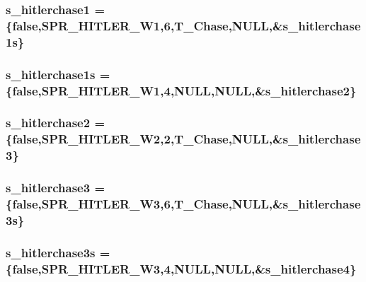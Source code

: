 \label{WL__ACT2_8C_a6982d149c8cf782eb51cdbd3885455cc}
\hypertarget{WL__ACT2_8C_aa89b8ca9d464e45092cc99529d5abef4}{
\subsubsection[{s\_\-hitlerchase1}]{ {\bf s\_\-hitlerchase1} = \{false,SPR\_\-HITLER\_\-W1,6,T\_\-Chase,NULL,\&{\bf s\_\-hitlerchase1s}\}}}
\label{WL__ACT2_8C_aa89b8ca9d464e45092cc99529d5abef4}
\hypertarget{WL__ACT2_8C_ad6fab59f3a334df59d3037a705c072da}{
\subsubsection[{s\_\-hitlerchase1s}]{ {\bf s\_\-hitlerchase1s} = \{false,SPR\_\-HITLER\_\-W1,4,NULL,NULL,\&{\bf s\_\-hitlerchase2}\}}}
\label{WL__ACT2_8C_ad6fab59f3a334df59d3037a705c072da}
\hypertarget{WL__ACT2_8C_add95d80cb6d278641cdad052769e29a6}{
\subsubsection[{s\_\-hitlerchase2}]{ {\bf s\_\-hitlerchase2} = \{false,SPR\_\-HITLER\_\-W2,2,T\_\-Chase,NULL,\&{\bf s\_\-hitlerchase3}\}}}
\label{WL__ACT2_8C_add95d80cb6d278641cdad052769e29a6}
\hypertarget{WL__ACT2_8C_a62624eaaaca44b10e1db9922b7bb9433}{
\subsubsection[{s\_\-hitlerchase3}]{ {\bf s\_\-hitlerchase3} = \{false,SPR\_\-HITLER\_\-W3,6,T\_\-Chase,NULL,\&{\bf s\_\-hitlerchase3s}\}}}
\label{WL__ACT2_8C_a62624eaaaca44b10e1db9922b7bb9433}
\hypertarget{WL__ACT2_8C_a20c282c075c0b1b525d887f2169e22c4}{
\subsubsection[{s\_\-hitlerchase3s}]{ {\bf s\_\-hitlerchase3s} = \{false,SPR\_\-HITLER\_\-W3,4,NULL,NULL,\&{\bf s\_\-hitlerchase4}\}}}
